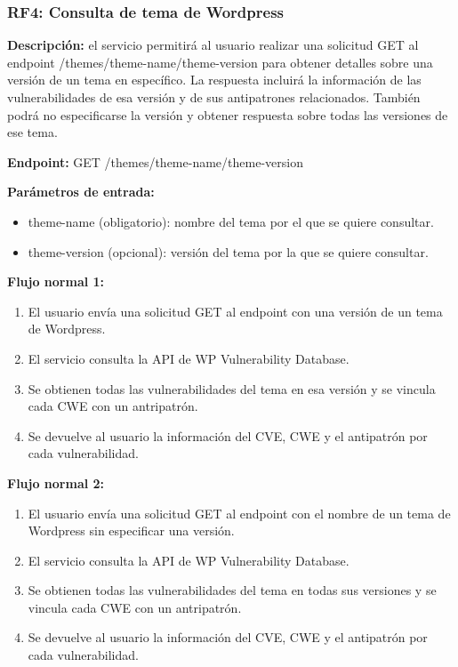 \subsubsection{RF4: Consulta de tema de Wordpress}

\textbf{Descripción:} el servicio permitirá al usuario realizar una solicitud GET al endpoint /themes/{theme-name}/{theme-version} para obtener detalles sobre una versión de un tema en específico. La respuesta incluirá la información de las vulnerabilidades de esa versión y de sus antipatrones relacionados.  También podrá no especificarse la versión y obtener respuesta sobre todas las versiones de ese tema.

\textbf{Endpoint:} GET /themes/{theme-name}/{theme-version}

\textbf{Parámetros de entrada: }

\begin{itemize}
    \item theme-name (obligatorio): nombre del tema por el que se quiere consultar.
    \item theme-version (opcional): versión del tema por la que se quiere consultar.
\end{itemize}

\textbf{Flujo normal 1:}

\begin{enumerate}
    \item El usuario envía una solicitud GET al endpoint con una versión de un tema de Wordpress.
    \item El servicio consulta la API de WP Vulnerability Database.
    \item Se obtienen todas las vulnerabilidades del tema en esa versión y se vincula cada CWE con un antripatrón.
    \item Se devuelve al usuario la información del CVE, CWE y el antipatrón por cada vulnerabilidad.
\end{enumerate}

\textbf{Flujo normal 2:}

\begin{enumerate}
    \item El usuario envía una solicitud GET al endpoint con el nombre de un tema de Wordpress sin especificar una versión.
    \item El servicio consulta la API de WP Vulnerability Database.
    \item Se obtienen todas las vulnerabilidades del tema en todas sus versiones y se vincula cada CWE con un antripatrón.
    \item Se devuelve al usuario la información del CVE, CWE y el antipatrón por cada vulnerabilidad.
\end{enumerate}

